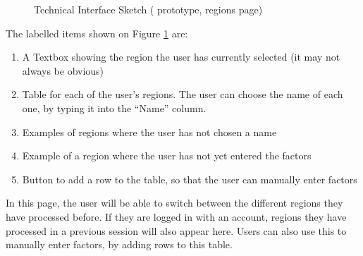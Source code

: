 \documentclass[12pt]{report}
\begin{document}
\begin{figure}[H]
\caption{Technical Interface Sketch ( prototype, regions page)}\label{fig:interfaceSketch2.3}
\end{figure}

The labelled items shown on Figure \ref{fig:interfaceSketch2.3} are:

\begin{enumerate}
    \item A Textbox showing the region the user has currently selected (it may not always be obvious)
    \item Table for each of the user's regions. The user can choose the name of each one, by typing it into the ``Name'' column.
    \item Examples of regions where the user has not chosen a name
    \item Example of a region where the user has not yet entered the factors
    \item Button to add a row to the table, so that the user can manually enter factors
\end{enumerate}

In this page, the user will be able to switch between the different regions they have processed before. If they are logged in with an account, regions they have processed in a previous session will also appear here. Users can also use this to manually enter factors, by adding rows to this table.
\end{document}
